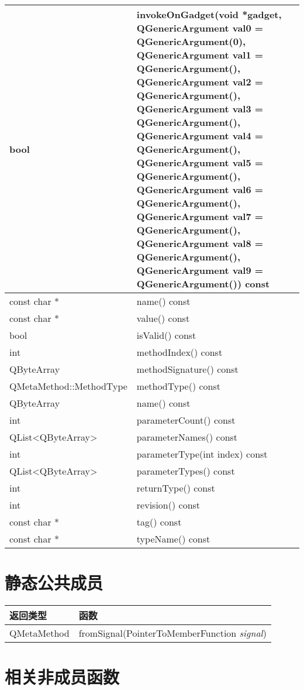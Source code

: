 \begin{longtable}[l]{|l|m{27em}|}
\hline
bool &	invokeOnGadget(void *gadget, QGenericArgument val0 = QGenericArgument(0), QGenericArgument val1 = QGenericArgument(), QGenericArgument val2 = QGenericArgument(), QGenericArgument val3 = QGenericArgument(), QGenericArgument val4 = QGenericArgument(), QGenericArgument val5 = QGenericArgument(), QGenericArgument val6 = QGenericArgument(), QGenericArgument val7 = QGenericArgument(), QGenericArgument val8 = QGenericArgument(), QGenericArgument val9 = QGenericArgument()) const \\
\hline
const char * 	&name() const \\
\hline
const char * 	& value() const \\ 
\hline
bool & 	isValid() const \\ 
\hline
int	& methodIndex() const \\ 
\hline
QByteArray &	methodSignature() const \\ 
\hline
QMetaMethod::MethodType	 & methodType() const \\
\hline
QByteArray & 	name() const \\ 
\hline
int	& parameterCount() const \\
\hline
QList<QByteArray>	& parameterNames() const \\
\hline
int	& parameterType(int index) const \\
\hline
QList<QByteArray> &	parameterTypes() const \\
\hline
int	& returnType() const \\
\hline
int	& revision() const \\ 
\hline
const char *	& tag() const \\ 
\hline
const char *	& typeName() const \\ 
\hline
\end{longtable}


\section{静态公共成员}


\begin{tabular}{|l|l|}
\hline
返回类型 &	函数 \\ 
\hline
QMetaMethod 	&fromSignal(PointerToMemberFunction \emph{signal}) \\ 
\hline
\end{tabular}

\section{相关非成员函数}

